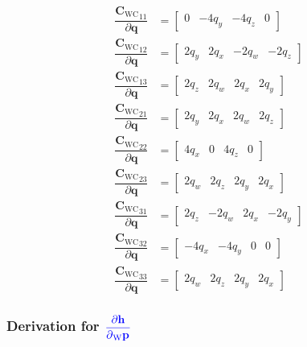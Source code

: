 \documentclass{report}
\renewcommand{\Vec}[1]{{\mathbf{#1}}}
\newcommand{\Mat}[1]{{\mathbf{#1}}}
\newcommand{\quat}{{\Vec{q}}}
\newcommand{\cam}{{\text{C}}}
\newcommand{\world}{{\text{W}}}
\newcommand{\KineNotationTransform}[3]{{{#1}_{#2#3}}}
\newcommand{\KineNotationPart}[3]{{{{}_{#2}} {#1}_{#3}}}
\newcommand{\rot}{{\Mat{C}}}
\newcommand{\Rot}[2]{{\KineNotationTransform{\rot}{#1}{#2}}}
\newcommand{\point}{\Vec{p}}
\newcommand{\Pt}[1]{{\KineNotationPart{\point}{#1}{}}}
\newcommand{\camRot}{{\Rot{\world}{\cam}}}
\newcommand{\projFunc}{{\Vec{h}}}
\begin{document}
\begin{align}
  \dfrac{\camRot_{11}}{\partial{\quat}} &=
    \begin{bmatrix}
    0 & -4q_{y} & -4q_{z} & 0
    \end{bmatrix} \\
  \dfrac{\camRot_{12}}{\partial{\quat}} &=
    \begin{bmatrix}
      2q_{y} & 2q_{x} & -2q_{w} & -2q_{z}
    \end{bmatrix} \\
  \dfrac{\camRot_{13}}{\partial{\quat}} &=
    \begin{bmatrix}
      2q_{z} & 2q_{w} & 2q_{x} & 2q_{y}
    \end{bmatrix} \\
  \dfrac{\camRot_{21}}{\partial{\quat}} &=
  \begin{bmatrix}
    2q_{y} & 2q_{x} & 2q_{w} & 2q_{z}
  \end{bmatrix} \\
  \dfrac{\camRot_{22}}{\partial{\quat}} &=
    \begin{bmatrix}
      4q_{x} & 0 & 4q_{z} & 0
    \end{bmatrix} \\
  \dfrac{\camRot_{23}}{\partial{\quat}} &=
    \begin{bmatrix}
      2q_{w} & 2q_{z} & 2q_{y} & 2q_{x}
    \end{bmatrix} \\
  \dfrac{\camRot_{31}}{\partial{\quat}} &=
    \begin{bmatrix}
      2q_{z} & -2q_{w} & 2q_{x} & -2q_{y}
    \end{bmatrix} \\
  \dfrac{\camRot_{32}}{\partial{\quat}} &=
    \begin{bmatrix}
      -4q_{x} & -4q_{y} & 0 & 0
    \end{bmatrix} \\
  \dfrac{\camRot_{33}}{\partial{\quat}} &=
    \begin{bmatrix}
      2q_{w} & 2q_{z} & 2q_{y} & 2q_{x}
    \end{bmatrix}
\end{align}


\subsubsection*{Derivation for
$\color{blue} \dfrac{\partial{\projFunc}}{\partial{\Pt{\world}}}$}
\end{document}
